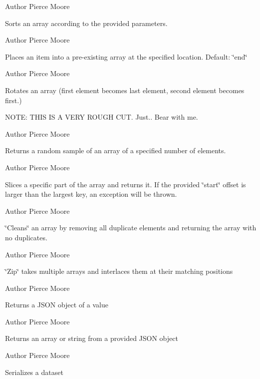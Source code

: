\begin{DoxyAuthor}{Author}
Pierce Moore
\end{DoxyAuthor}
Sorts an array according to the provided parameters.

\begin{DoxyAuthor}{Author}
Pierce Moore
\end{DoxyAuthor}
Places an item into a pre-\/existing array at the specified location. Default\-: \char`\"{}end\char`\"{}

\begin{DoxyAuthor}{Author}
Pierce Moore
\end{DoxyAuthor}
Rotates an array (first element becomes last element, second element becomes first.)

N\-O\-T\-E\-: T\-H\-I\-S I\-S A V\-E\-R\-Y R\-O\-U\-G\-H C\-U\-T. Just.. Bear with me.

\begin{DoxyAuthor}{Author}
Pierce Moore
\end{DoxyAuthor}
Returns a random sample of an array of a specified number of elements.

\begin{DoxyAuthor}{Author}
Pierce Moore
\end{DoxyAuthor}
Slices a specific part of the array and returns it. If the provided \char`\"{}start\char`\"{} offset is larger than the largest key, an exception will be thrown.

\begin{DoxyAuthor}{Author}
Pierce Moore
\end{DoxyAuthor}
\char`\"{}\-Cleans\char`\"{} an array by removing all duplicate elements and returning the array with no duplicates.

\begin{DoxyAuthor}{Author}
Pierce Moore
\end{DoxyAuthor}
\char`\"{}\-Zip\char`\"{} takes multiple arrays and interlaces them at their matching positions

\begin{DoxyAuthor}{Author}
Pierce Moore
\end{DoxyAuthor}
Returns a J\-S\-O\-N object of a value

\begin{DoxyAuthor}{Author}
Pierce Moore
\end{DoxyAuthor}
Returns an array or string from a provided J\-S\-O\-N object

\begin{DoxyAuthor}{Author}
Pierce Moore
\end{DoxyAuthor}
Serializes a dataset

